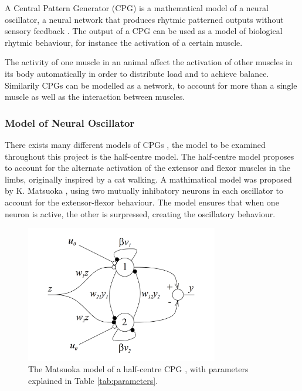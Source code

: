 A Central Pattern Generator (CPG) is a mathematical model of a neural oscillator, a neural network that produces rhytmic patterned outputs without sensory feedback \cite{CPGHauert}. The output of a CPG can be used as a model of biological rhytmic behaviour, for instance the activation of a certain muscle.

The activity of one muscle in an animal affect the activation of other muscles in its body automatically in order to distribute load and to achieve balance. Similarily CPGs can be modelled as a network, to account for more than a single muscle as well as the interaction between muscles.



\subsubsection{Model of Neural Oscillator} \label{modelOfNeuralOscillator}

There exists many different models of CPGs \cite{CPGmodels}, the model to be examined throughout this project is the half-centre model. The half-centre model proposes to account for the alternate activation of the extensor and flexor muscles in the limbs, originally inspired by a cat walking. A mathimatical model was proposed by K. Matsuoka \cite{matsuoka}, using two mutually inhibatory neurons in each oscillator to account for the extensor-flexor behaviour. The model ensures that when one neuron is active, the other is surpressed, creating the oscillatory behaviour.

\begin{figure}[htbp]
    \centering
    \includegraphics[width=0.75\textwidth]{include/figure/matsuoka.png}
    \caption{The Matsuoka model of a half-centre CPG \cite{CPGwolff}, with parameters explained in Table \ref{tab:parameters}.}
    \label{fig:matsuoka}
\end{figure}

